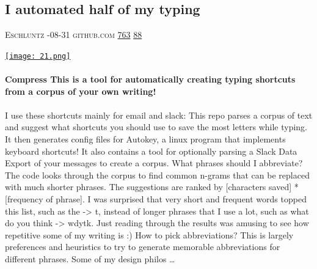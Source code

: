 \documentclass[10pt,a4paper]{article}
\begin{document}
\begin{multicols}{2}
\raggedcolumns
\noindent\begin{minipage}{\linewidth}
\medskip
\subsection{I automated half of my typing}
\textsc{\footnotesize
{\scriptsize\faUser}\space 
Eschluntz 
{\scriptsize\faCalendar}-08-31 
{\scriptsize\faGithub}\space 
github.com 
{\scriptsize\faThumbsOUp}\space 
\href{http://news.ycombinator.com/item?id=37326870\&utm\_term=comment}{763} 
{\scriptsize\faComments}\space 
\href{http://news.ycombinator.com/item?id=37326870\&utm\_term=comment}{88} 
}
\par\medskip\noindent
\href{https://github.com/eschluntz/compress?utm\_source=hackernewsletter\&utm\_medium=email\&utm\_term=show\_hn}{
    \texttt{[image: 21.png]}
}
\end{minipage}
\paragraph{}
\textbf{Compress
This is a tool for automatically creating typing shortcuts from a corpus of your own writing!}
\paragraph{}
 I use these shortcuts mainly for email and slack:
This repo parses a corpus of text and suggest what shortcuts you should use to save the most letters while typing. It then generates config files for Autokey, a linux program that implements keyboard shortcuts!
It also contains a tool for optionally parsing a Slack Data Export of your messages to create a corpus.
What phrases should I abbreviate?
The code looks through the corpus to find common n-grams that can be replaced with much shorter phrases. The suggestions are ranked by
[characters saved] * [frequency of phrase].
I was surprised that very short and frequent words topped this list, such as
the -> t, instead of longer phrases that I use a lot, such as
what do you think -> wdytk.
Just reading through the results was amusing to see how repetitive some of my writing is :)
How to pick abbreviations?
This is largely preferences and heuristics to try to generate memorable abbreviations for different phrases. Some of my design philos
\dots\par
\noindent\begin{minipage}{\linewidth}
\medskip

\end{minipage}
\end{multicols}
\end{document}
